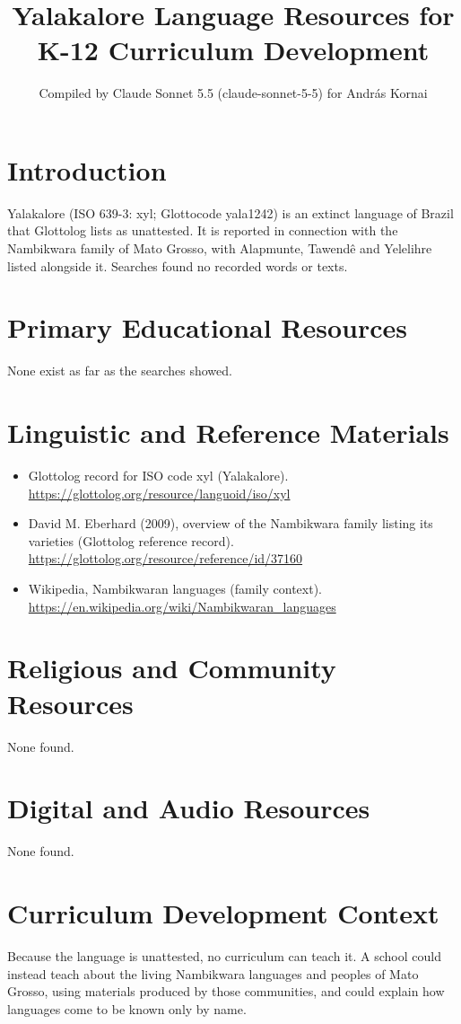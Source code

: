 \documentclass[12pt]{article}
\title{Yalakalore Language Resources for K-12 Curriculum Development}
\author{Compiled by Claude Sonnet 5.5 (claude-sonnet-5-5) for Andr\'as Kornai}
\date{}
\begin{document}
\maketitle

\section{Introduction}
Yalakalore (ISO 639-3: xyl; Glottocode yala1242) is an extinct language of Brazil that Glottolog lists as unattested. It is reported in connection with the Nambikwara family of Mato Grosso, with Alapmunte, Tawend\^e and Yelelihre listed alongside it. Searches found no recorded words or texts.

\section{Primary Educational Resources}
None exist as far as the searches showed.

\section{Linguistic and Reference Materials}
\begin{itemize}
\item Glottolog record for ISO code xyl (Yalakalore). \url{https://glottolog.org/resource/languoid/iso/xyl}
\item David M. Eberhard (2009), overview of the Nambikwara family listing its varieties (Glottolog reference record). \url{https://glottolog.org/resource/reference/id/37160}
\item Wikipedia, Nambikwaran languages (family context). \url{https://en.wikipedia.org/wiki/Nambikwaran_languages}
\end{itemize}

\section{Religious and Community Resources}
None found.

\section{Digital and Audio Resources}
None found.

\section{Curriculum Development Context}
Because the language is unattested, no curriculum can teach it. A school could instead teach about the living Nambikwara languages and peoples of Mato Grosso, using materials produced by those communities, and could explain how languages come to be known only by name.
\end{document}
